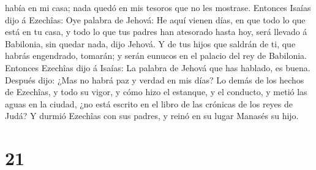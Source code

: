 había en mi casa; nada quedó en mis tesoros que no les mostrase.
 Entonces Isaías dijo á Ezechîas: Oye palabra de Jehová:
 He aquí vienen días, en que todo lo que está en tu casa, y
todo lo que tus padres han atesorado hasta hoy, será llevado á
Babilonia, sin quedar nada, dijo Jehová.  Y de tus hijos
que saldrán de ti, que habrás engendrado, tomarán; y serán eunucos en el
palacio del rey de Babilonia.  Entonces Ezechîas dijo á
Isaías: La palabra de Jehová que has hablado, es buena. Después dijo:
¿Mas no habrá paz y verdad en mis días?  Lo demás de los
hechos de Ezechîas, y todo su vigor, y cómo hizo el estanque, y el
conducto, y metió las aguas en la ciudad, ¿no está escrito en el libro
de las crónicas de los reyes de Judá?  Y durmió Ezechîas
con sus padres, y reinó en su lugar Manasés su hijo.

\hypertarget{section-20}{%
\section{21}\label{section-20}}

